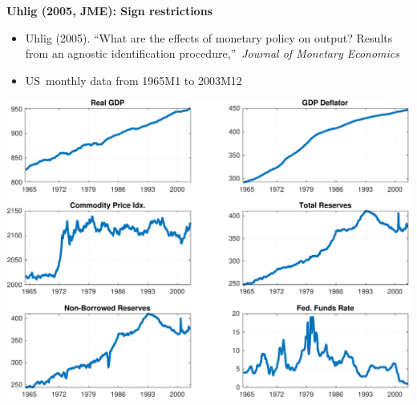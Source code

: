 \documentclass[10pt,english,t,aspectratio=169,ignorenonframetext]{beamer}
\begin{document}
\begin{frame}
{\textbf{Uhlig (2005, JME): Sign restrictions}}

\begin{minipage}{0.4\textwidth}
\bigskip
\begin{itemize}
\item Uhlig (2005). \textquotedblleft What are the effects of monetary policy on output? Results from an agnostic identification
procedure,\textquotedblright\ \emph{Journal of Monetary Economics} \bigskip

\item US\ monthly data from 1965M1 to 2003M12
\end{itemize}
\end{minipage}
\quad 
\begin{minipage}{0.55\textwidth}
\includegraphics[width=\textwidth]{Uhlig_DATA.pdf}
\end{minipage}
\end{frame}

\end{document}
